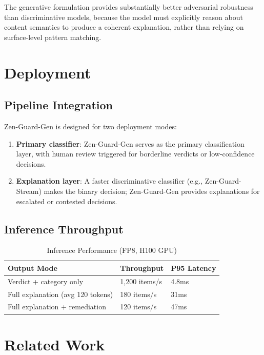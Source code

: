 \documentclass[11pt,a4paper]{article}
\begin{document}
The generative formulation provides substantially better adversarial robustness than discriminative models, because the model must explicitly reason about content semantics to produce a coherent explanation, rather than relying on surface-level pattern matching.

\section{Deployment}

\subsection{Pipeline Integration}

Zen-Guard-Gen is designed for two deployment modes:

\begin{enumerate}
  \item \textbf{Primary classifier}: Zen-Guard-Gen serves as the primary classification layer, with human review triggered for borderline verdicts or low-confidence decisions.
  \item \textbf{Explanation layer}: A faster discriminative classifier (e.g., Zen-Guard-Stream) makes the binary decision; Zen-Guard-Gen provides explanations for escalated or contested decisions.
\end{enumerate}

\subsection{Inference Throughput}

\begin{table}[H]
\centering
\caption{Inference Performance (FP8, H100 GPU)}
\begin{tabular}{lll}
\toprule
\textbf{Output Mode} & \textbf{Throughput} & \textbf{P95 Latency} \\
\midrule
Verdict + category only & 1,200 items/s & 4.8ms \\
Full explanation (avg 120 tokens) & 180 items/s & 31ms \\
Full explanation + remediation & 120 items/s & 47ms \\
\bottomrule
\end{tabular}
\end{table}

\section{Related Work}
\end{document}
